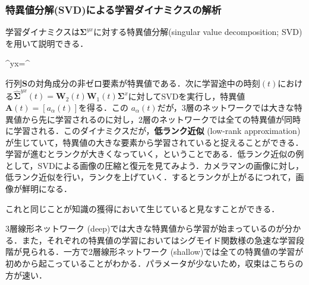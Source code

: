 \subsubsection{特異値分解(SVD)による学習ダイナミクスの解析}
学習ダイナミクスは$ \mathbf{\Sigma}^{yx}$に対する特異値分解(singular value decomposition; SVD)を用いて説明できる．


\mathbf{\Sigma}^{yx}=^\top


行列$ \mathbf{ S}$の対角成分の非ゼロ要素が特異値である．次に学習途中の時刻$(t)$における$\hat{\mathbf{\Sigma}}^{yx}(t)=\mathbf{W}_2 (t) \mathbf{W}_1(t) \mathbf{\Sigma}^{x}$に対してSVDを実行し，特異値$\mathbf{A}(t)=[a_{\alpha}(t)]$を得る．この $a _ {\alpha}(t)$だが，3層のネットワークでは大きな特異値から先に学習されるのに対し，2層のネットワークでは全ての特異値が同時に学習される．このダイナミクスだが，\textbf{低ランク近似} (low-rank approximation)が生じていて，特異値の大きな要素から学習されていると捉えることができる．学習が進むとランクが大きくなっていく，ということである．低ランク近似の例として，SVDによる画像の圧縮と復元を見てみよう．カメラマンの画像に対し，低ランク近似を行い，ランクを上げていく．するとランクが上がるにつれて，画像が鮮明になる．





これと同じことが知識の獲得において生じていると見なすことができる．





3層線形ネットワーク (deep)では大きな特異値から学習が始まっているのが分かる．また，それぞれの特異値の学習においてはシグモイド関数様の急速な学習段階が見られる．一方で2層線形ネットワーク (shallow)では全ての特異値の学習が初めから起こっていることがわかる．パラメータが少ないため，収束はこちらの方が速い．

